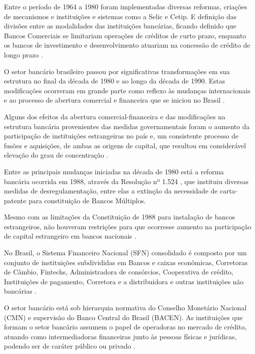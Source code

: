 \documentclass[12pt,12pt,openright,oneside,a4paper,chapter=TITLE,section=TITLE,subsection=TITLE,subsubsection=TITLE,english,french,spanish,portugues,sumario=tradicional]{abntex2}
\begin{document}
Entre o período de 1964 a 1980 foram implementadas diversas reformas, criações de mecanismos e instituições e sistemas como a Selic e Cetip. E definição das divisões entre as modalidades das instituições bancárias, ficando definido que Bancos Comerciais se limitariam operações de créditos de curto prazo, enquanto os bancos de investimento e desenvolvimento atuariam na concessão de crédito de longo prazo \cite{camargo:2009}.

O setor bancário brasileiro passou por significativas transformações em sua
estrutura no final da década de 1980 e ao longo da década de 1990. Estas
modificações ocorreram em grande parte como reflexo às mudanças internacionais
e ao processo de abertura comercial e financeira que se iniciou no Brasil
\cite{camargo:2009}.

Alguns dos efeitos da abertura comercial-financeira e das modificações na
estrutura bancária provenientes das medidas governamentais foram o aumento da
participação de instituições estrangeiras no país e, um consistente processo de
fusões e aquisições, de ambas as origens de capital, que resultou em
considerável elevação do grau de concentração \cite{camargo:2009}.

Entre as principais mudanças iniciadas na década de 1980 está a reforma
bancária ocorrida em 1988, através da Resolução nº 1.524 \cite{Res:1524:1988},
que instituiu diversas medidas de desregulamentação, entre elas a extinção da
necessidade de carta-patente para constituição de Bancos Múltiplos.

Mesmo com as limitações da Constituição de 1988 \cite{constituicao:1988} para
instalação de bancos estrangeiros, não houveram restrições para que ocorresse
aumento na participação de capital estrangeiro em bancos nacionais
\cite{camargo:2009}.

No Brasil, o Sistema Financeiro Nacional (SFN) consolidado é composto por um conjunto de instituições subdivididas em Bancos e caixas econômicas, Corretoras de Câmbio, Fintechs, Administradora de consórcios, Cooperativa de crédito, Instituições de pagamento, Corretora e a distribuidora e outras instituições não bancárias \cite{Lei:4595:1964}.

O setor bancário está sob hierarquia normativa do Conselho Monetário Nacional (CMN) e supervisão do Banco Central do Brasil (BACEN). As instituições que formam o setor bancário assumem o papel de operadoras no mercado de crédito, atuando como intermediadoras financeiras junto às pessoas físicas e jurídicas, podendo ser de caráter público ou privado \cite{Lei:4595:1964}.
\end{document}
